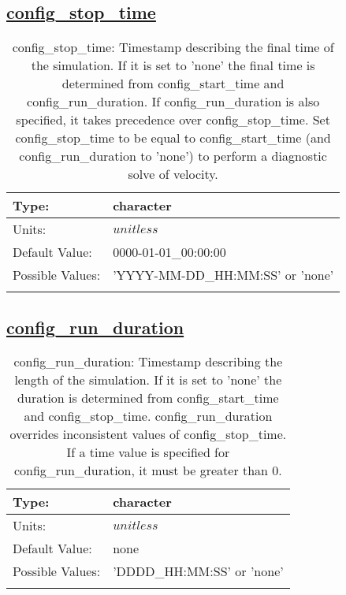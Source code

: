 \subsection[config\_stop\_time]{\hyperref[sec:nm_tab_time_management]{config\_stop\_time}}
\label{subsec:nm_sec_config_stop_time}
\begin{center}
\begin{longtable}{| p{2.0in} | p{4.0in} |}
    \hline
    Type: & character \\
    \hline
    Units: & $unitless$ \\
    \hline
    Default Value: & 0000-01-01\_00:00:00 \\
    \hline
    Possible Values: & 'YYYY-MM-DD\_HH:MM:SS' or 'none' \\
    \hline
    \caption{config\_stop\_time: Timestamp describing the final time of the simulation. If it is set to 'none' the final time is determined from config\_start\_time and config\_run\_duration.  If config\_run\_duration is also specified, it takes precedence over config\_stop\_time.  Set config\_stop\_time to be equal to config\_start\_time (and config\_run\_duration to 'none') to perform a diagnostic solve of velocity.}
\end{longtable}
\end{center}
\subsection[config\_run\_duration]{\hyperref[sec:nm_tab_time_management]{config\_run\_duration}}
\label{subsec:nm_sec_config_run_duration}
\begin{center}
\begin{longtable}{| p{2.0in} | p{4.0in} |}
    \hline
    Type: & character \\
    \hline
    Units: & $unitless$ \\
    \hline
    Default Value: & none \\
    \hline
    Possible Values: & 'DDDD\_HH:MM:SS' or 'none' \\
    \hline
    \caption{config\_run\_duration: Timestamp describing the length of the simulation. If it is set to 'none' the duration is determined from config\_start\_time and config\_stop\_time. config\_run\_duration overrides inconsistent values of config\_stop\_time. If a time value is specified for config\_run\_duration, it must be greater than 0.}
\end{longtable}
\end{center}
